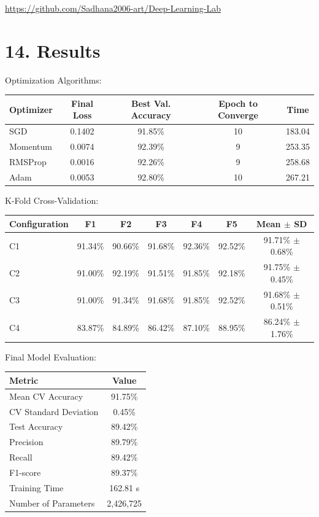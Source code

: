 \documentclass[10pt]{article}
\begin{document}
\url{https://github.com/Sadhana2006-art/Deep-Learning-Lab}

\section*{14. Results}

Optimization Algorithms:

\begin{center}
\begin{tabular}{|l|c|c|c|c|}
\hline
Optimizer & Final Loss & Best Val. Accuracy & Epoch to Converge & Time\\
\hline
SGD & 0.1402 & 91.85\% & 10 & 183.04 \\
Momentum & 0.0074 & 92.39\% & 9 & 253.35 \\
RMSProp & 0.0016 & 92.26\% & 9 & 258.68 \\
Adam & 0.0053 & 92.80\% & 10 & 267.21 \\
\hline
\end{tabular}
\end{center}

K-Fold Cross-Validation:

\begin{center}
\begin{tabular}{|l|c|c|c|c|c|c|}
\hline
Configuration & F1 & F2 & F3 & F4 & F5 & Mean $\pm$ SD\\
\hline
C1 & 91.34\% & 90.66\% & 91.68\% & 92.36\% & 92.52\% & 91.71\% $\pm$ 0.68\%\\
C2 & 91.00\% & 92.19\% & 91.51\% & 91.85\% & 92.18\% & 91.75\% $\pm$ 0.45\%\\
C3 & 91.00\% & 91.34\% & 91.68\% & 91.85\% & 92.52\% & 91.68\% $\pm$ 0.51\%\\
C4 & 83.87\% & 84.89\% & 86.42\% & 87.10\% & 88.95\% & 86.24\% $\pm$ 1.76\%\\
\hline
\end{tabular}
\end{center}

Final Model Evaluation:

\begin{center}
\begin{tabular}{|l|c|}
\hline
Metric & Value\\
\hline
Mean CV Accuracy & 91.75\% \\
CV Standard Deviation & 0.45\% \\
Test Accuracy & 89.42\% \\
Precision & 89.79\% \\
Recall & 89.42\% \\
F1-score & 89.37\% \\
Training Time & 162.81 s \\
Number of Parameters & 2,426,725 \\
\hline
\end{tabular}
\end{center}
\end{document}

